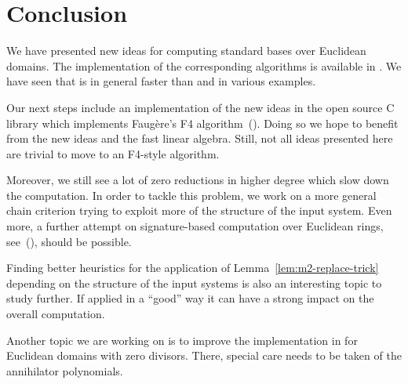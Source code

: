 \section{Conclusion}
We have presented new ideas for computing standard bases over Euclidean
domains.
The implementation of the corresponding algorithms is available in \singular. We
have seen that \singular is in general faster than \macaulay and \magma in
various examples.

Our next steps include an implementation of the new ideas in the open source C library
\gbl which implements Faug\`ere's F4 algorithm~(\cite{gbl}). Doing so we hope to
benefit from the new ideas and the fast linear algebra. Still, not all ideas
presented here are trivial to move to an F4-style algorithm.

Moreover, we still see a lot of zero reductions in higher degree which slow down
the computation. In order to tackle this problem, we work on a more general chain
criterion trying to exploit more of the structure of the input system. Even
more, a further attempt on signature-based computation over Euclidean rings,
see~(\cite{eppSigZ2017}), should be possible.

Finding better heuristics for the application of
Lemma~\ref{lem:m2-replace-trick} depending on the structure of the input systems
is also an interesting topic to study further. If applied in a ``good'' way it
can have a strong impact on the overall computation.

Another topic we are working on is to improve the implementation in \singular
for Euclidean domains with zero divisors. There, special care needs to be
taken of the annihilator polynomials.
